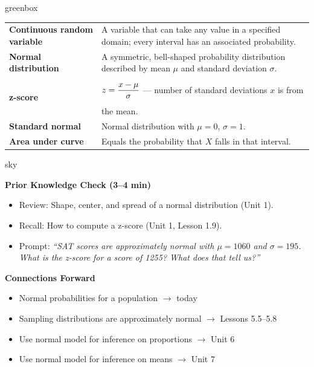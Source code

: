 \documentclass[10pt]{article}
\newcommand{\TallMath}[1]{$\displaystyle #1\rule[-1.4em]{0pt}{3.2em}$}
\begin{document}
\begin{skillbox}{greenbox}
\renewcommand{\arraystretch}{1.3}
\begin{tabularx}{\linewidth}{@{}lX@{}}
    \textbf{Continuous random variable} & A variable that can take any value in a
    specified domain; every interval has an associated probability.\\
    \textbf{Normal distribution} & A symmetric, bell-shaped probability distribution
    described by mean $\mu$ and standard deviation $\sigma$.\\
    \textbf{z-score} & \TallMath{z = \dfrac{x - \mu}{\sigma}} --- number of standard
    deviations $x$ is from the mean.\\
    \textbf{Standard normal} & Normal distribution with $\mu = 0$, $\sigma = 1$.\\
    \textbf{Area under curve} & Equals the probability that $X$ falls in that interval.\\
\end{tabularx}
\end{skillbox}

\begin{skillbox}{sky}
\begin{minipage}[t]{0.48\linewidth}
    \textbf{Prior Knowledge Check (3--4 min)}
    \begin{itemize}
        \item Review: Shape, center, and spread of a normal distribution (Unit 1).
        \item Recall: How to compute a z-score (Unit 1, Lesson 1.9).
        \item Prompt: \textit{``SAT scores are approximately normal with $\mu = 1060$
              and $\sigma = 195$. What is the z-score for a score of 1255? What does
              that tell us?''}
    \end{itemize}
\end{minipage}
\hfill
\begin{minipage}[t]{0.48\linewidth}
    \textbf{Connections Forward}
    \begin{itemize}
        \item Normal probabilities for a population $\to$ today
        \item Sampling distributions are approximately normal $\to$ Lessons 5.5--5.8
        \item Use normal model for inference on proportions $\to$ Unit 6
        \item Use normal model for inference on means $\to$ Unit 7
    \end{itemize}
\end{minipage}
\end{skillbox}
\end{document}
